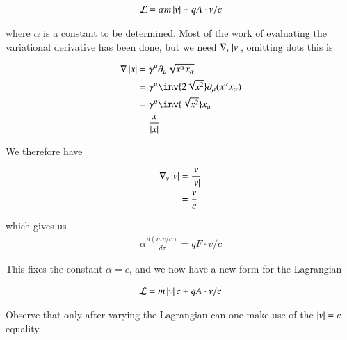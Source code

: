 \begin{align}
\mathcal{L} = \alpha m \left\lvert{v}\right\rvert + q A \cdot v/c
\end{align}

where $\alpha$ is a constant to be determined.  Most of the work of evaluating the variational derivative has been done, but we need $\nabla_v \left\lvert{v}\right\rvert$, omitting dots this is

\begin{align*}
\grad \Abs{x}
&= \gamma^\mu \partial_\mu \sqrt{x^\alpha x_\alpha} \\
&= \gamma^\mu \inv{2 \sqrt{x^2}} \partial_\mu (x^\alpha x_\alpha) \\
&= \gamma^\mu \inv{\sqrt{x^2}} x_\mu \\
&= \frac{x}{\Abs{x}}
\end{align*}

We therefore have

\begin{align*}
\nabla_v \left\lvert{v}\right\rvert
&= \frac{v}{\left\lvert{v}\right\rvert} \\
&= \frac{v}{c} \\
\end{align*}

which gives us
\begin{align}
\alpha \frac{d(mv/c)}{d\tau} = q F \cdot v/c 
\end{align}

This fixes the constant $\alpha = c$, and we now have a new form for the Lagrangian

\begin{align}
\mathcal{L} = m \left\lvert{v}\right\rvert c + q A \cdot v/c
\end{align}

Observe that only after varying the Lagrangian can one make use of the $\left\lvert{v}\right\rvert = c$ equality.


%
%

%
